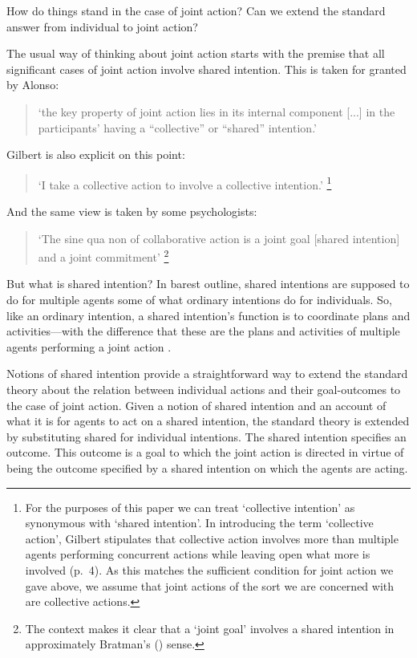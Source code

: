 \documentclass[12pt,a4paper]{extarticle}
\begin{document}

How do things stand in the case of joint action?  Can we extend the standard answer from individual to joint action?  

The usual way of thinking about joint action starts with the premise that all significant cases of joint action involve shared intention.  This is taken for granted by Alonso:
%
\begin{quote}
`the key property of joint action lies in its internal component [...] in the participants’ having a “collective” or “shared” intention.' \citep[pp. 444-5]{alonso_shared_2009}
\end{quote}
%
Gilbert is also explicit on this point:  
%
\begin{quote} 
`I take a collective action to involve a collective intention.'  \citep[p.\ 5]{Gilbert:2006wr}\footnote{
For the purposes of this paper we can treat `collective intention' as synonymous with `shared intention'.  
In introducing the term `collective action', Gilbert stipulates that collective action involves more than multiple agents performing concurrent actions while leaving open what more is involved (p.\ 4).   
As this matches the sufficient condition for joint action we gave above, we assume that joint actions of the sort we are concerned with are collective actions.
}
\end{quote}
%
And the same view is taken by some psychologists:
%
\begin{quote}
`The sine qua non of collaborative action is a joint goal [shared intention] and a joint commitment’ 
\citep[p.\ 181]{tomasello:2008origins}\footnote{
The context makes it clear that a `joint goal' involves a shared intention in approximately Bratman's (\citeyear{Bratman:1993je}) sense.
}
\end{quote}
%
But what is shared intention?  
In barest outline, shared intentions are supposed to do for multiple agents some of what ordinary intentions do for individuals.  So, like an ordinary intention, a shared intention's function is to coordinate plans and activities---with the difference that these are the plans and activities of multiple agents performing a joint action \citep{Bratman:1993je}.


Notions of shared intention provide a straightforward way to extend the standard theory about the relation between individual actions and their goal-outcomes to the case of joint action.  
Given a notion of shared intention and an account of what it is for agents to act on a shared intention, 
the standard theory is extended by substituting shared for individual intentions.  The shared intention specifies an outcome.  This outcome is a goal to which the joint action is directed in virtue of being the outcome specified by a shared intention on which the agents are acting.
\end{document}

